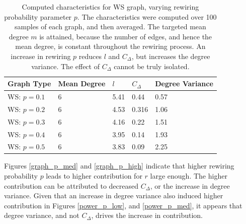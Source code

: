 \FloatBarrier
\begin{table}[!h]
\begin{center}
\begin{tabular}{|l|l|l|l|l|}
\hline
Graph Type & Mean Degree & $l$ & $C_\Delta$ & Degree Variance \\ \hline
WS: $p=0.1$        & 6        & 5.41                         & 0.44                  & 0.57           \\ \hline
WS: $p=0.2$        &6           & 4.53                         & 0.316                   & 1.06               \\ \hline
WS: $p=0.3$        &6           & 4.16                         & 0.22                   & 1.51               \\ \hline
WS: $p=0.4$       & 6        & 3.95                         & 0.14                  & 1.93           \\ \hline
WS: $p=0.5$         & 6           & 3.83                         & 0.09                   & 2.25            \\ \hline
\end{tabular}
\caption{Computed characteristics for WS graph, varying rewiring probability parameter $p$. The characteristics were computed over 100 samples of each graph, and then averaged. The targeted mean degree $m$ is attained, because the number of edges, and hence the mean degree, is constant throughout the rewiring process. An increase in rewiring $p$ reduces $l$ and $C_\Delta$, but increases the degree variance. The effect of $C_\Delta$ cannot be truly isolated. } \label{graph_stats_WS}
\end{center}
\end{table}
\FloatBarrier

\FloatBarrier
 

\FloatBarrier
Figures \ref{graph_p_med} and \ref{graph_p_high} indicate that higher rewiring probability $p$ leads to higher contribution for $r$ large enough. The higher contribution can be attributed to decreased $C_\Delta$, or the increase in degree variance. Given that an increase in degree variance also induced higher contribution in Figures \ref{power_p_low}, and \ref{power_p_med}, it appears that degree variance, and not $C_\Delta$, drives the increase in contribution.  \\

